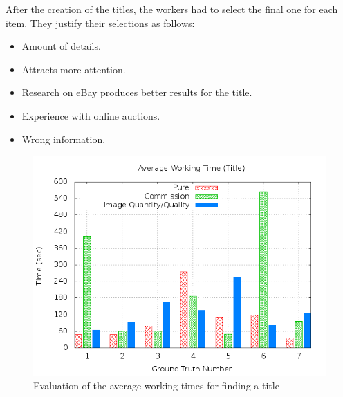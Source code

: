 After the creation of the titles, the workers had to select the final one for each item. They justify their selections as follows:
\begin{itemize}
	\item Amount of details. 
	\item Attracts more attention. 
	\item Research on eBay produces better results for the title. 
	\item Experience with online auctions. 
	\item Wrong information. 
\end{itemize}
\begin{figure}
\centering
\includegraphics[scale=0.55]{images/plots/crowdsourcing/plot_time_title.png}
\caption{Evaluation of the average working times for finding a title}
\label{crowdsourcing_time_title}
\end{figure}
